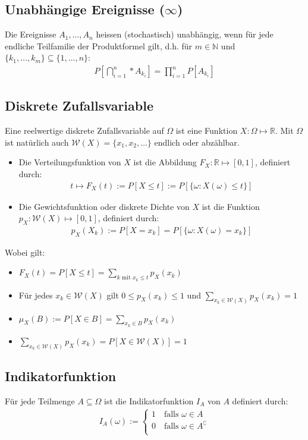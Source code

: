 \documentclass[8pt]{extarticle}
\newcommand{\N}{\mathbb{N}}
\newcommand{\R}{\mathbb{R}}
\newcommand{\W}{\mathcal{W}}
\newcommand{\Pn}{\prod_{i = 1}^n}
\newcommand{\ereignisse}{A_1, \dots, A_n}
\newcommand{\bigsubsection}{\bigcap_{i = 1}^n}
\begin{document}
\begin{multicols*}{3}
  \subsection*{Unabhängige Ereignisse ($\infty$)}
  Die Ereignisse $\ereignisse$ heissen (stochastisch) unabhängig,
  wenn für jede endliche Teilfamilie der Produktformel gilt, d.h.
  für $m \in \N$ und $\{k_1, \dots, k_m\} \subseteq \{1, \dots, n\}$:
  \begin{align*}
    P \left[\bigsubsection* A_{k_i} \right] = \Pn P[A_{k_i}]
  \end{align*}
  \subsection*{Diskrete Zufallsvariable}
  Eine reelwertige diskrete Zufallsvariable auf $\Omega$ ist eine Funktion
  $X : \Omega \mapsto \R$. Mit $\Omega$ ist natürlich auch
  $\W(X) = \{x_1, x_2, \dots\}$ endlich oder abzählbar.
  \begin{itemize}
    \item Die Verteilungsfunktion
          von $X$ ist die Abbildung $F_X : \R \mapsto [0, 1]$, definiert durch:
          \begin{align*}
            t \mapsto F_X(t) := P[X \leq t] := P[\{\omega : X(\omega) \leq t\}]
          \end{align*}
    \item Die Gewichtsfunktion oder diskrete Dichte von $X$ ist die Funktion
          $p_X : \W(X) \mapsto [0, 1]$, definiert durch:
          \begin{align*}
            p_X(X_k) := P[X = x_k] = P[\{\omega : X(\omega) = x_k\}]
          \end{align*}
  \end{itemize}
  Wobei gilt:
  \begin{itemize}
    \item $F_X(t) = P[X \leq t] = \sum_{k \text{ mit } x_k \leq t} p_X(x_k)$
    \item Für jedes $x_k \in \W(X)$ gilt $0 \leq p_X(x_k) \leq 1$ und $\sum_{x_k \in \W(X)} p_X(x_k) = 1$
    \item $\mu_X(B) := P[X \in B] = \sum_{x_k \in B} p_X(x_k)$
    \item $\sum_{x_k \in \W(X)} p_X(x_k) = P[X \in \W(X)] = 1$
  \end{itemize}
  \subsection*{Indikatorfunktion}
  Für jede Teilmenge $A \subseteq \Omega$ ist die Indikatorfunktion
  $I_A$ von $A$ definiert durch:
  \begin{align*}
    I_A(\omega) :=
    \begin{cases}
      1 \quad \text{falls } \omega \in A             \\
      0 \quad \text{falls } \omega \in A^\complement \\
    \end{cases}
  \end{align*}

\end{multicols*}
\end{document}
